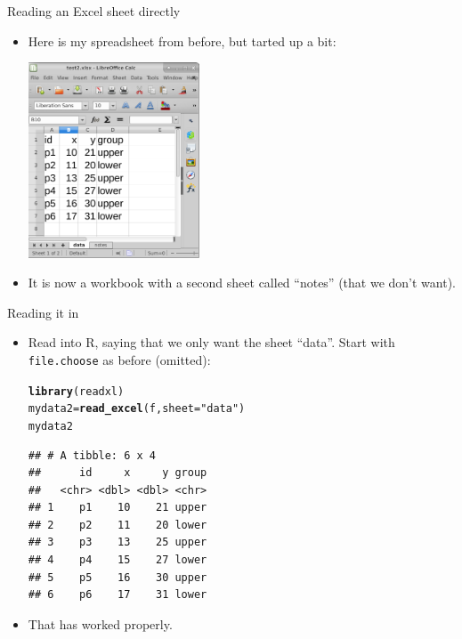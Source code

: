 \documentclass[unknownkeysallowed]{beamer}\usepackage[]{graphicx}\usepackage[]{color}
\makeatletter
\newcommand{\hlstr}[1]{\textcolor[rgb]{0.192,0.494,0.8}{#1}}%
\newcommand{\hlstd}[1]{\textcolor[rgb]{0.345,0.345,0.345}{#1}}%
\newcommand{\hlkwb}[1]{\textcolor[rgb]{0.69,0.353,0.396}{#1}}%
\newcommand{\hlkwc}[1]{\textcolor[rgb]{0.333,0.667,0.333}{#1}}%
\newcommand{\hlkwd}[1]{\textcolor[rgb]{0.737,0.353,0.396}{\textbf{#1}}}%
\newenvironment{kframe}{%
 \def\at@end@of@kframe{}%
 \ifinner\ifhmode%
  \def\at@end@of@kframe{\end{minipage}}%
  \begin{minipage}{\columnwidth}%
 \fi\fi%
 \def\FrameCommand##1{\hskip\@totalleftmargin \hskip-\fboxsep
 \colorbox{shadecolor}{##1}\hskip-\fboxsep
     \hskip-\linewidth \hskip-\@totalleftmargin \hskip\columnwidth}%
 \MakeFramed {\advance\hsize-\width
   \@totalleftmargin\z@ \linewidth\hsize
   \@setminipage}}%
 {\par\unskip\endMakeFramed%
 \at@end@of@kframe}
\newenvironment{knitrout}{}{} %
\makeatother
\begin{document}
\begin{frame}[fragile]{Reading an Excel sheet directly}
  
  \begin{itemize}
  \item Here is my spreadsheet from before, but tarted up a bit:
    
\includegraphics[width=0.4\textwidth]{excel}
\item It is now a workbook with a second sheet called ``notes'' (that
  we don't want).
  \end{itemize}
  
\end{frame}

\begin{frame}[fragile]{Reading it in}
  
  \begin{itemize}
\item Read into R, saying that we only want the sheet ``data''. Start
  with \texttt{file.choose} as before (omitted):
  

\begin{knitrout}
\color{fgcolor}\begin{kframe}
\begin{alltt}
\hlkwd{library}\hlstd{(readxl)}
\hlstd{mydata2}\hlkwb{=}\hlkwd{read_excel}\hlstd{(f,}\hlkwc{sheet}\hlstd{=}\hlstr{"data"}\hlstd{)}
\hlstd{mydata2}
\end{alltt}
\begin{verbatim}
## # A tibble: 6 x 4
##      id     x     y group
##   <chr> <dbl> <dbl> <chr>
## 1    p1    10    21 upper
## 2    p2    11    20 lower
## 3    p3    13    25 upper
## 4    p4    15    27 lower
## 5    p5    16    30 upper
## 6    p6    17    31 lower
\end{verbatim}
\end{kframe}
\end{knitrout}
\item That has worked properly.
  \end{itemize}
  
\end{frame}
\end{document}
